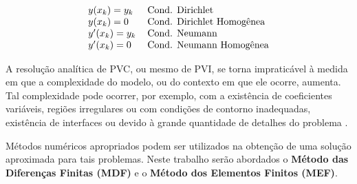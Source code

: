 \begin{equation}
	\begin{tabular}{l l}
		$y(x_k) = y_k $ 
		& Cond. Dirichlet \\
		$y(x_k) = 0$
		& Cond. Dirichlet Homogênea\  \\
		$y'(x_k) = y_k$
		& Cond. Neumann \\
		$y'(x_k) = 0$
		& Cond. Neumann Homogênea\  \\
	\end{tabular}
\end{equation}

A resolução analítica de PVC, ou mesmo de PVI, se torna impraticável à medida em que a complexidade do modelo, ou do contexto em que ele ocorre, aumenta.
Tal complexidade pode ocorrer, por exemplo, com a existência de coeficientes variáveis, regiões irregulares ou com condições de contorno inadequadas, existência de interfaces ou devido à grande quantidade de detalhes do problema
\citep[p. 410]{powers}.

Métodos numéricos apropriados podem ser utilizados na obtenção de uma solução aproximada para tais problemas. Neste trabalho serão abordados o \textbf{Método das Diferenças Finitas (MDF)} e o \textbf{Método dos Elementos Finitos (MEF)}.

